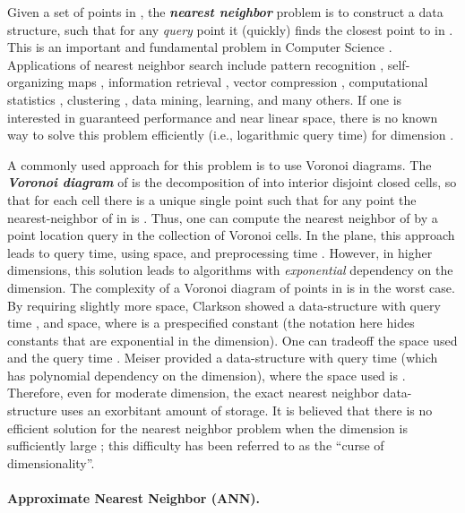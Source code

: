 \documentclass[12pt]{article}
\makeatletter
\newcommand{\emphic}[2]{\textcolor{blue25}{\textbf{\emph{#1}}}\index{#2}}
\newcommand{\emphi}[1]{\emphic{#1}{#1}}
\newcommand{\Term}[1]{\textsf{#1}}
\newcommand{\TermI}[1]{\Term{#1}\index{#1@\Term{#1}}}
\theoremstyle{remark}{\theorembodyfont{\rm} \newtheorem{remark}[theorem]{Remark}}
\newcommand{\ANN}{\TermI{ANN}\xspace}
\makeatother
\begin{document}
Given a set  of  points in , the \emphi{nearest
   neighbor} problem is to construct a data structure, such that for
any \emph{query} point  it (quickly) finds the closest point
to  in .  This is an important and fundamental
problem in Computer Science \cite{sdi-nnmlv-06, c-tpfgn-08,
   ai-nohaa-08, c-nnsms-06}. Applications of nearest neighbor search
include pattern recognition \cite{fh-dandc-49, ch-nnpc-67},
self-organizing maps \cite{k-som-01}, information retrieval
\cite{swy-vsmai-75}, vector compression \cite{gg-vqsc-91},
computational statistics \cite{dw-nnmd-82}, clustering
\cite{dhs-pc-01}, data mining, learning, and many others.  If one is
interested in guaranteed performance and near linear space, there is
no known way to solve this problem efficiently (i.e., logarithmic
query time) for dimension .

A commonly used approach for this problem is to use Voronoi
diagrams. The \emphi{Voronoi diagram} of  is the
decomposition of  into interior disjoint closed cells, so that
for each cell  there is a unique single point 
such that for any point  the
nearest-neighbor of  in  is .  Thus, one can
compute the nearest neighbor of  by a point location query in
the collection of Voronoi cells.  In the plane, this approach leads to
 query time, using  space, and preprocessing time
.  However, in higher dimensions, this solution leads to
algorithms with \emph{exponential} dependency on the dimension. The
complexity of a Voronoi diagram of  points in  is
 in the worst case.  By requiring
slightly more space, Clarkson \cite{c-racpq-88} showed a
data-structure with query time , and
 space, where  is a
prespecified constant (the  notation here hides constants
that are exponential in the dimension). One can tradeoff the space
used and the query time \cite{am-rsps-93}. Meiser \cite{m-plah-93}
provided a data-structure with query time  (which
has polynomial dependency on the dimension), where the space used is
.  Therefore, even for moderate dimension,
the exact nearest neighbor data-structure uses an exorbitant amount of
storage.  It is believed that there is no efficient solution for the
nearest neighbor problem when the dimension is sufficiently large
\cite{mp-p-69}; this difficulty has been referred to as the ``curse of
dimensionality''.

\paragraph{Approximate Nearest Neighbor (\ANN).}
\end{document}

